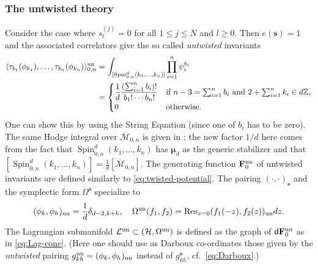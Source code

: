 \documentclass[11pt]{amsart}
\theoremstyle{definition} %
\theoremstyle{remark} %
\newcommand{\ZZ}{\mathbb Z}
\newcommand{\Res}{\operatorname{Res}}
\newcommand{\un}{{\rm un}}
\def\ol{\overline}
\newcommand{\bmu}{\boldsymbol{\mu}}
\newcommand{\bs}{\mathbf{s}}
\newcommand{\bF}{\mathbf{F}}
\newcommand{\cM}{\mathcal{M}}
\newcommand{\cL}{\mathcal{L}}
\newcommand{\cH}{\mathcal{H}}
\newcommand{\dd}{\mathsf{d}}
\newcommand{\Spin}{\operatorname{Spin}}
\newcommand{\ov}{\overline}
\begin{document}
\subsubsection{The untwisted theory} 
\label{subsubsect:untwisted} 
Consider the case where $s_l^{(j)}=0$ for all $1\le j\le N$ and 
$l\ge 0$. Then $e(\bs)=1$ and the associated correlators 
give the so called \emph{untwisted} invariants    
\begin{align}
\label{eq:untwisted-invariants}
\begin{split} 
\langle \tau_{b_1}(\phi_{k_1}),\dots,\tau_{b_n}(\phi_{k_n})
\rangle^{\un}_{0,n} & =\int_{[\Spin^d_{0,n}({k_1},\dots,{k_n})]} 
\prod_{i=1}^n\psi_i^{b_i}\\
& =\begin{cases} 
\displaystyle 
\frac{1}{d} \frac{(\sum_{i=1}^n b_i)!}{b_1!\cdots b_n!} & 
\text{if } n-3= \sum_{i=1}^n b_i \text{ and } 
2+\sum_{i=1}^n k_i\in d\ZZ,\\ 
0 & \text{otherwise.}
\end{cases}
\end{split} 
\end{align} 
One can show this by using the String Equation (since 
one of $b_i$ has to be zero). 
The same Hodge integral over $\ol{\cM}_{0,n}$ 
is given in \cite[Eqn (2)]{Faber-Pandharipande};  
the new factor $1/d$ here comes from the fact that 
$\Spin_{0,n}^d(k_1,\dots,k_n)$ has $\bmu_d$ as 
the generic stabilizer and that 
$[\Spin_{0,n}^d(k_1,\dots,k_n)] = 
\frac{1}{d} [\ov{\cM}_{0,n}]$. 
The generating function $\bF^\un_0$ of untwisted 
invariants are defined similarly to \eqref{eq:twisted-potential}. 
The pairing $(\cdot,\cdot)_{\bs}$ 
and the symplectic form $\Omega^\bs$ specialize to 
\[			
(\phi_k,\phi_h)_\un = \frac{1}{d} \delta_{d-2, k+h}, 
\quad 
\Omega^\un(f_1,f_2) = \Res_{z=0} (f_1(-z),f_2(z))_\un dz. 
\]
The Lagrangian submanifold $\cL^\un \subset (\cH,\Omega^\un)$ 
is defined as the graph of $\dd \bF^\un_0$ as in \eqref{eq:Lag-cone}. 
(Here one should use as Darboux co-ordinates those  
given by the \emph{untwisted} pairing $g_{kh}^\un 
= (\phi_k,\phi_h)_{\un}$ instead of $g_{kh}^\bs$, cf.\ 
\eqref{eq:Darboux}.) 
\end{document}
